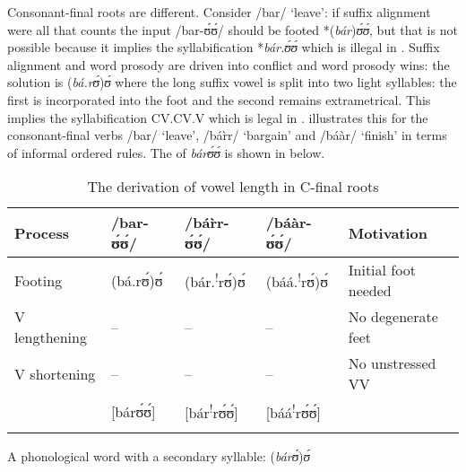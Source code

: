 \documentclass[output=paper,newtxmath,modfonts,nonflat,draftmode]{langsci/langscibook}
\begin{document}
\z

Consonant-final roots are different. Consider /bar/ ‘leave’: if suffix alignment were all that counts the input /bar-ʊ́ʊ́/ should be footed *(\textit{bár})\textit{ʊ́ʊ́}, but that is not possible because it implies the syllabification *\textit{bá}\textit{r.ʊ́ʊ́} which is illegal in . Suffix alignment and word prosody are driven into conflict and word prosody wins: the solution is (\textit{bá.rʊ́})\textit{ʊ́} where the long suffix vowel is split into two light syllables: the first is incorporated into the foot and the second remains extrametrical. This implies the syllabification CV.CV.V which is legal in  \citep[3-4]{Kennedy1966}.  illustrates this for the consonant-final verbs /bar/ ‘leave’, /bár̀r/ ‘bargain’ and /báàr/ ‘finish’ in terms of informal ordered rules. The  of \textit{bárʊ́ʊ́} is shown in  below.

\begin{table}
\begin{tabularx}{\textwidth}{lllll}
\lsptoprule
{Process} & /bar-ʊ́ʊ́/ & /bá{r̀}r-ʊ́ʊ́/ & /báàr-ʊ́ʊ́/ & {Motivation}\\
\midrule
Footing & (bá.rʊ́)ʊ́ & (bár.\textsuperscript{!}rʊ́)ʊ́ & (báá.\textsuperscript{!}rʊ́)ʊ́ & Initial foot needed\\
V lengthening & -- & -- & -- & No degenerate feet\\
V shortening & -- & -- & -- & No unstressed VV\\
& [bárʊ́ʊ́] & [bár\textsuperscript{!}rʊ́ʊ́] & [báá\textsuperscript{!}rʊ́ʊ́] & \\
\lspbottomrule
\end{tabularx}
\caption{The derivation of vowel length in C-final roots}
\label{tab:anttila:13}
\end{table}

\newpage 
\ea\label{ex:anttila:2} A phonological word with a secondary syllable: (\textit{bárʊ́})\textit{ʊ́}\\
\vspace*{-1.5cm}       
%
%
%
%
%
%        
        
\end{document}
